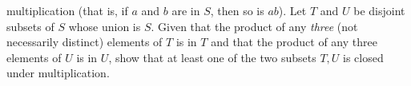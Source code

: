 multiplication (that is, if $a$ and $b$ are in $S$, then so is $ab$).
Let $T$ and $U$ be disjoint subsets of $S$ whose union is $S$. Given
that the product of any {\em three} (not necessarily distinct)
elements of $T$ is in $T$ and that the product of any three elements
of $U$ is in $U$, show that at least one of the two subsets $T,U$ is
closed under multiplication.
